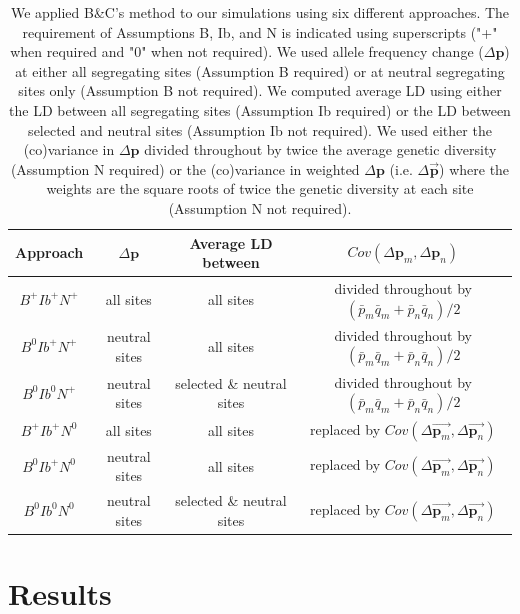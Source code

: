 \documentclass[12pt]{article}
\begin{document}
\begin{bibunit}
\begin{table}
    \centering
    \begin{tabular}{|c|c|c|c|}
    \hline
        Approach & $\Delta\textbf{p}$ & Average LD between &  $Cov(\Delta\textbf{p}_m,\Delta\textbf{p}_n)$  \\
         \hline
         $B^+Ib^+N^+$&all sites&all sites&divided throughout by ${(\bar{p}_m\bar{q}_m + \bar{p}_n\bar{q}_n )/2}$\\
         $B^0Ib^+N^+$&neutral sites&all sites&divided throughout by ${(\bar{p}_m\bar{q}_m + \bar{p}_n\bar{q}_n )/2}$\\
         $B^0Ib^0N^+$&neutral sites&selected \& neutral sites&divided throughout by ${(\bar{p}_m\bar{q}_m + \bar{p}_n\bar{q}_n )/2}$\\
         $B^+Ib^+N^0$&all sites&all sites&replaced by $Cov(\Delta\overrightarrow{\textbf{p}_m},\Delta\overrightarrow{\textbf{p}_n})$\\
         $B^0Ib^+N^0$&neutral sites&all sites&replaced by $Cov(\Delta\overrightarrow{\textbf{p}_m},\Delta\overrightarrow{\textbf{p}_n})$\\
         $B^0Ib^0N^0$&neutral sites&selected \& neutral sites&replaced by $Cov(\Delta\overrightarrow{\textbf{p}_m},\Delta\overrightarrow{\textbf{p}_n})$\\
         \hline
    \end{tabular}
    \caption{We applied B\&C's method to our simulations using six different approaches. The requirement of Assumptions B, Ib, and N is indicated using superscripts ("+" when required and "0" when not required). We used allele frequency change ($\Delta\textbf{p}$) at either all segregating sites (Assumption B required) or at neutral segregating sites only (Assumption B not required). We computed average LD using either the LD between all segregating sites (Assumption Ib required) or the LD between selected and neutral sites (Assumption Ib not required). We used either the (co)variance in $\Delta\textbf{p}$ divided throughout by twice the average genetic diversity (Assumption N required) or the (co)variance in weighted $\Delta\textbf{p}$ (i.e. $\Delta\overrightarrow{\textbf{p}}$) where the weights are the square roots of twice the genetic diversity at each site (Assumption N not required).}
    \label{tab:Table_2}
\end{table}

\section*{Results}

\end{bibunit}
\end{document}
